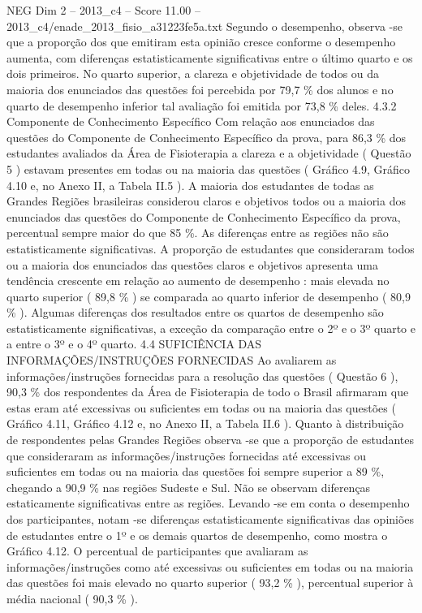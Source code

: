 \begin{textsample}{NEG Dim 2 – 2013\_c4 – Score 11.00 – 2013\_c4/enade\_2013\_fisio\_a31223fe5a.txt}
Segundo o desempenho, observa -se que a proporção dos que emitiram esta opinião cresce conforme o desempenho aumenta, com diferenças estatisticamente significativas entre o último quarto e os dois primeiros.
No quarto superior, a clareza e objetividade de todos ou da maioria dos enunciados das questões foi percebida por 79,7 \% dos alunos e no quarto de desempenho inferior tal avaliação foi emitida por 73,8 \% deles. 4.3.2 Componente de Conhecimento Específico Com relação aos enunciados das questões do Componente de Conhecimento Específico da prova, para 86,3 \% dos estudantes avaliados da Área de Fisioterapia a clareza e a objetividade ( Questão 5 ) estavam presentes em todas ou na maioria das questões ( Gráfico 4.9, Gráfico 4.10 e, no Anexo II, a Tabela II.5 ).
A maioria dos estudantes de todas as Grandes Regiões brasileiras considerou claros e objetivos todos ou a maioria dos enunciados das questões do Componente de Conhecimento Específico da prova, percentual sempre maior do que 85 \%.
As diferenças entre as regiões não são estatisticamente significativas.
A proporção de estudantes que consideraram todos ou a maioria dos enunciados das questões claros e objetivos apresenta uma tendência crescente em relação ao aumento de desempenho : mais elevada no quarto superior ( 89,8 \% ) se comparada ao quarto inferior de desempenho ( 80,9 \% ).
Algumas diferenças dos resultados entre os quartos de desempenho são estatisticamente significativas, a exceção da comparação entre o 2º e o 3º quarto e a entre o 3º e o 4º quarto. 4.4 SUFICIÊNCIA DAS INFORMAÇÕES/INSTRUÇÕES FORNECIDAS Ao avaliarem as informações/instruções fornecidas para a resolução das questões ( Questão 6 ), 90,3 \% dos respondentes da Área de Fisioterapia de todo o Brasil afirmaram que estas eram até excessivas ou suficientes em todas ou na maioria das questões ( Gráfico 4.11, Gráfico 4.12 e, no Anexo II, a Tabela II.6 ).
Quanto à distribuição de respondentes pelas Grandes Regiões observa -se que a proporção de estudantes que consideraram as informações/instruções fornecidas até excessivas ou suficientes em todas ou na maioria das questões foi sempre superior a 89 \%, chegando a 90,9 \% nas regiões Sudeste e Sul.
Não se observam diferenças estaticamente significativas entre as regiões.
Levando -se em conta o desempenho dos participantes, notam -se diferenças estatisticamente significativas das opiniões de estudantes entre o 1º e os demais quartos de desempenho, como mostra o Gráfico 4.12.
O percentual de participantes que avaliaram as informações/instruções como até excessivas ou suficientes em todas ou na maioria das questões foi mais elevado no quarto superior ( 93,2 \% ), percentual superior à média nacional ( 90,3 \% ).

\end{textsample}
